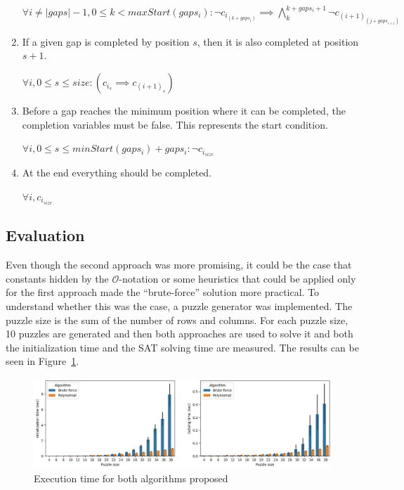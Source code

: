 \documentclass[12pt]{article}
\begin{document}
\begin{enumerate}
  \begin{center}
    $\forall i \ne |gaps|-1, 0 \le k < maxStart(gaps_i): \neg c_i_{(k+gaps_i)} \implies \bigwedge_k^{k+gaps_i+1} \neg c_{(i+1)}_{(j + gaps_{i+1})}$
  \end{center}

  \item If a given gap is completed by position $s$, then it is also completed at position $s+1$.
  \begin{center}
    $\forall i, 0 \le s \le size: (c_i_s \implies c_{(i+1)}_s) $
  \end{center}

  \item Before a gap reaches the minimum position where it can be completed, the completion variables must be false. This represents the start condition.
  \begin{center}
    $\forall i, 0 \le s \le minStart(gaps_i)+gaps_i: \neg c_i_{size}$
  \end{center}

  \item At the end everything should be completed.

  \begin{center}
    $\forall i, c_i_{size}$
  \end{center}
\end{enumerate}

\subsection*{Evaluation}

Even though the second approach was more promising, it could be the case that constants hidden by the $\mathcal{O}$-notation or some heuristics that could be applied only for the first approach made the ``brute-force'' solution more practical.
To understand whether this was the case, a puzzle generator was implemented.
The puzzle size is the sum of the number of rows and columns.
For each puzzle size, 10 puzzles are generated and then both approaches are used to solve it and both the initialization time and the SAT solving time are measured.
The results can be seen in Figure~\ref{fig:bench}.

\begin{figure}[H]
  \includegraphics[scale=0.5]{bench.png}
  \centering
  \caption{Execution time for both algorithms proposed}
  \label{fig:bench}
\end{figure}
\end{document}
